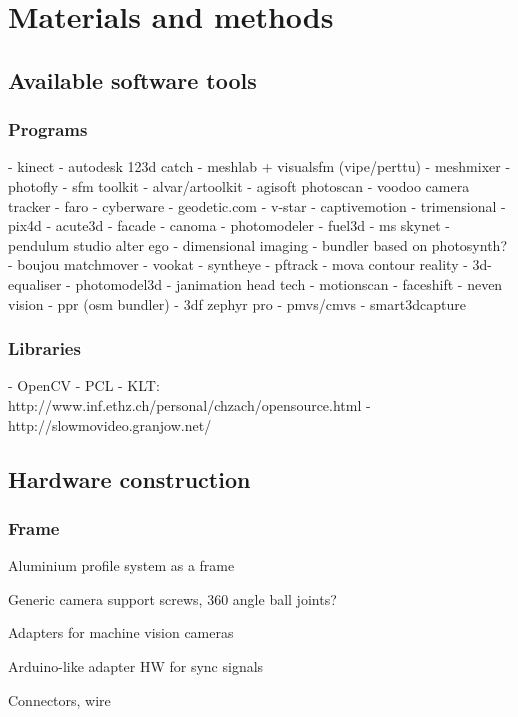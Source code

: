 \section{Materials and methods}

\subsection{Available software tools}

\subsubsection{Programs}

- kinect
- autodesk 123d catch
- meshlab + visualsfm (vipe/perttu)
- meshmixer
- photofly
- sfm toolkit
- alvar/artoolkit
- agisoft photoscan
- voodoo camera tracker
- faro
- cyberware
- geodetic.com
- v-star
- captivemotion
- trimensional
- pix4d
- acute3d
- facade
- canoma
- photomodeler
- fuel3d
- ms skynet
- pendulum studio alter ego
- dimensional imaging
- bundler based on photosynth?
- boujou matchmover
- vookat
- syntheye
- pftrack
- mova contour reality
- 3d-equaliser
- photomodel3d
- janimation head tech
- motionscan
- faceshift
- neven vision
- ppr (osm bundler)
- 3df zephyr pro
- pmvs/cmvs
- smart3dcapture

\subsubsection{Libraries}

- OpenCV
- PCL
- KLT: http://www.inf.ethz.ch/personal/chzach/opensource.html
- http://slowmovideo.granjow.net/


\subsection{Hardware construction}

\subsubsection{Frame}

Aluminium profile system as a frame

Generic camera support screws, 360 angle ball joints?

Adapters for machine vision cameras

Arduino-like adapter HW for sync signals

Connectors, wire

